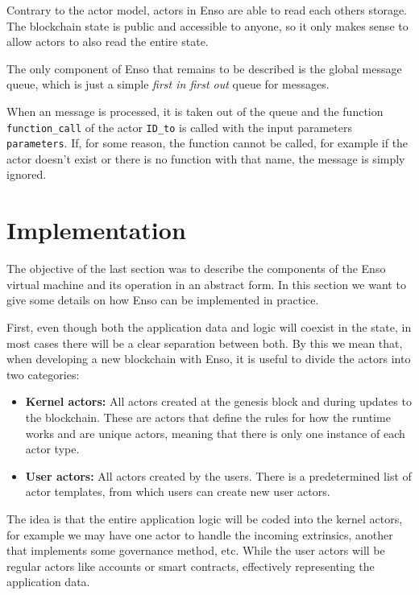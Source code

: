 \documentclass[conference]{IEEEtran}
\begin{document}
Contrary to the actor model, actors in Enso are able to read each others storage. The blockchain state is public and accessible to anyone, so it only makes sense to allow actors to also read the entire state.

The only component of Enso that remains to be described is the global message queue, which is just a simple \textit{first in first out} queue for messages.

When an message is processed, it is taken out of the queue and the function \texttt{function\_call} of the actor \texttt{ID\_to} is called with the input parameters \texttt{parameters}. If, for some reason, the function cannot be called, for example if the actor doesn't exist or there is no function with that name, the message is simply ignored.

\section{Implementation}
The objective of the last section was to describe the components of the Enso virtual machine and its operation in an abstract form. In this section we want to give some details on how Enso can be implemented in practice.

First, even though both the application data and logic will coexist in the state, in most cases there will be a clear separation between both. By this we mean that, when developing a new blockchain with Enso, it is useful to divide the actors into two categories:

\begin{itemize}
	\item \textbf{Kernel actors:} All actors created at the genesis block and during updates to the blockchain. These are actors that define the rules for how the runtime works and are unique actors, meaning that there is only one instance of each actor type.
	\item \textbf{User actors:} All actors created by the users. There is a predetermined list of actor templates, from which users can create new user actors.
\end{itemize}

The idea is that the entire application logic will be coded into the kernel actors, for example we may have one actor to handle the incoming extrinsics, another that implements some governance method, etc. While the user actors will be regular actors like accounts or smart contracts, effectively representing the application data.
\end{document}
